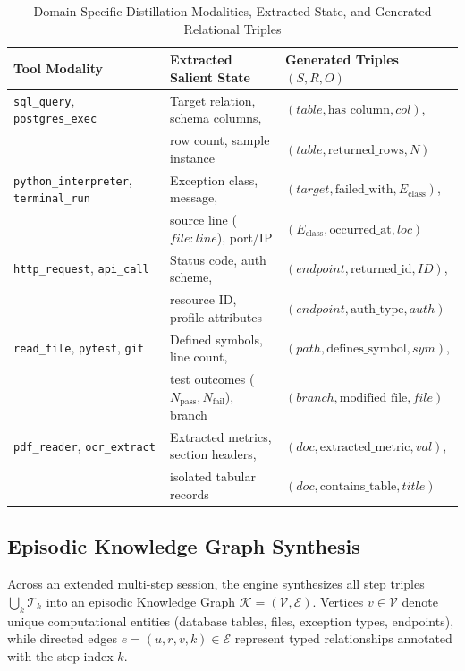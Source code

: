 \documentclass[lettersize,journal]{IEEEtran}
\begin{document}
\begin{table}[!t]
\caption{Domain-Specific Distillation Modalities, Extracted State, and Generated Relational Triples\label{tab:distillation_modalities}}
\centering
{\scriptsize
\begin{tabular}{lll}
\toprule
\textbf{Tool Modality} & \textbf{Extracted Salient State} & \textbf{Generated Triples $(S, R, O)$} \\
\midrule
\texttt{sql\_query}, \texttt{postgres\_exec} & Target relation, schema columns, & $(table, \text{has\_column}, col)$, \\
 & row count, sample instance & $(table, \text{returned\_rows}, N)$ \\
\addlinespace
\texttt{python\_interpreter}, \texttt{terminal\_run} & Exception class, message, & $(target, \text{failed\_with}, E_{\text{class}})$, \\
 & source line ($file:line$), port/IP & $(E_{\text{class}}, \text{occurred\_at}, loc)$ \\
\addlinespace
\texttt{http\_request}, \texttt{api\_call} & Status code, auth scheme, & $(endpoint, \text{returned\_id}, ID)$, \\
 & resource ID, profile attributes & $(endpoint, \text{auth\_type}, auth)$ \\
\addlinespace
\texttt{read\_file}, \texttt{pytest}, \texttt{git} & Defined symbols, line count, & $(path, \text{defines\_symbol}, sym)$, \\
 & test outcomes ($N_{\text{pass}}, N_{\text{fail}}$), branch & $(branch, \text{modified\_file}, file)$ \\
\addlinespace
\texttt{pdf\_reader}, \texttt{ocr\_extract} & Extracted metrics, section headers, & $(doc, \text{extracted\_metric}, val)$, \\
 & isolated tabular records & $(doc, \text{contains\_table}, title)$ \\
\bottomrule
\end{tabular}
}
\end{table}

\subsection{Episodic Knowledge Graph Synthesis}

Across an extended multi-step session, the engine synthesizes all step triples $\bigcup_k \mathcal{T}_k$ into an episodic Knowledge Graph $\mathcal{K} = (\mathcal{V}, \mathcal{E})$. Vertices $v \in \mathcal{V}$ denote unique computational entities (database tables, files, exception types, endpoints), while directed edges $e = (u, r, v, k) \in \mathcal{E}$ represent typed relationships annotated with the step index $k$. 
\end{document}
